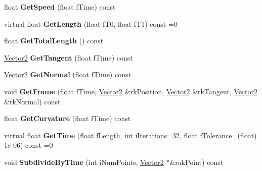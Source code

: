 \begin{DoxyCompactItemize}
\item 
float {\bfseries Get\+Speed} (float f\+Time) const \hypertarget{class_magnum_1_1_curve2_aeef4cd7dae8de8d4a7feb508e67e0bc3}{}\label{class_magnum_1_1_curve2_aeef4cd7dae8de8d4a7feb508e67e0bc3}

\item 
virtual float {\bfseries Get\+Length} (float f\+T0, float f\+T1) const  =0\hypertarget{class_magnum_1_1_curve2_a41cab213d5be0aef2661d2c5419affca}{}\label{class_magnum_1_1_curve2_a41cab213d5be0aef2661d2c5419affca}

\item 
float {\bfseries Get\+Total\+Length} () const \hypertarget{class_magnum_1_1_curve2_a6f362345c821b7e6d29700919d1de545}{}\label{class_magnum_1_1_curve2_a6f362345c821b7e6d29700919d1de545}

\item 
\hyperlink{class_magnum_1_1_vector2}{Vector2} {\bfseries Get\+Tangent} (float f\+Time) const \hypertarget{class_magnum_1_1_curve2_a47010bb970f0a007024edfdf6435b206}{}\label{class_magnum_1_1_curve2_a47010bb970f0a007024edfdf6435b206}

\item 
\hyperlink{class_magnum_1_1_vector2}{Vector2} {\bfseries Get\+Normal} (float f\+Time) const \hypertarget{class_magnum_1_1_curve2_a35f1565508835082c9bfb52ca828ec7f}{}\label{class_magnum_1_1_curve2_a35f1565508835082c9bfb52ca828ec7f}

\item 
void {\bfseries Get\+Frame} (float f\+Time, \hyperlink{class_magnum_1_1_vector2}{Vector2} \&rk\+Position, \hyperlink{class_magnum_1_1_vector2}{Vector2} \&rk\+Tangent, \hyperlink{class_magnum_1_1_vector2}{Vector2} \&rk\+Normal) const \hypertarget{class_magnum_1_1_curve2_a59c7c383894d4b41a562b47fc2416eec}{}\label{class_magnum_1_1_curve2_a59c7c383894d4b41a562b47fc2416eec}

\item 
float {\bfseries Get\+Curvature} (float f\+Time) const \hypertarget{class_magnum_1_1_curve2_a72471a7e0a1d34bb01b39e05ea91f5d6}{}\label{class_magnum_1_1_curve2_a72471a7e0a1d34bb01b39e05ea91f5d6}

\item 
virtual float {\bfseries Get\+Time} (float f\+Length, int i\+Iterations=32, float f\+Tolerance=(float) 1e-\/06) const  =0\hypertarget{class_magnum_1_1_curve2_af0bc1ef299de82443acb9f3424c89a0b}{}\label{class_magnum_1_1_curve2_af0bc1ef299de82443acb9f3424c89a0b}

\item 
void {\bfseries Subdivide\+By\+Time} (int i\+Num\+Points, \hyperlink{class_magnum_1_1_vector2}{Vector2} $\ast$\&rak\+Point) const \hypertarget{class_magnum_1_1_curve2_a291c1c9f0c0492089febdbc74458ce46}{}\label{class_magnum_1_1_curve2_a291c1c9f0c0492089febdbc74458ce46}


\end{DoxyCompactItemize}
